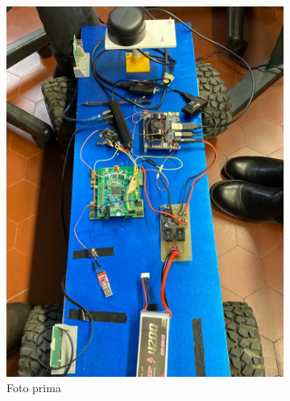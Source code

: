 \begin{figure}[h]
  \centering
  \begin{subfigure}[b]{0.35\textwidth}
    \includegraphics[width=\textwidth]{Capitolo1/Figs/foto_prima.png}
    \caption{Foto prima}
    \label{fig:foto_prima}   
  \end{subfigure}             
  \begin{subfigure}[b]{0.35\textwidth}

\end{subfigure}
\end{figure}
